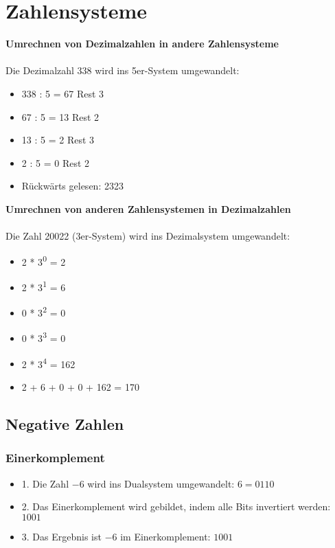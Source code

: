 \section{Zahlensysteme}
\textbf{Umrechnen von Dezimalzahlen in andere Zahlensysteme}\\\\
Die Dezimalzahl 338 wird ins 5er-System umgewandelt:
\begin{itemize}
    \item 338 : 5 = 67 Rest 3
    \item 67 : 5 = 13 Rest 2
    \item 13 : 5 = 2 Rest 3
    \item 2 : 5 = 0 Rest 2
    \item Rückwärts gelesen: 2323
\end{itemize}
\bigskip
\textbf{Umrechnen von anderen Zahlensystemen in Dezimalzahlen}\\\\
Die Zahl 20022 (3er-System) wird ins Dezimalsystem umgewandelt:
\begin{itemize}
    \item 2 * 3\textsuperscript{0} = 2
    \item 2 * 3\textsuperscript{1} = 6
    \item 0 * 3\textsuperscript{2} = 0
    \item 0 * 3\textsuperscript{3} = 0
    \item 2 * 3\textsuperscript{4} = 162
    \item 2 + 6 + 0 + 0 + 162 = 170
\end{itemize}
\subsection{Negative Zahlen}
\subsubsection{Einerkomplement}
\begin{itemize}
    \item 1. Die Zahl $-6$ wird ins Dualsystem umgewandelt: $6 = 0110$
    \item 2. Das Einerkomplement wird gebildet, indem alle Bits invertiert werden: $1001$
    \item 3. Das Ergebnis ist $-6$ im Einerkomplement: $1001$
    \end{itemize}
